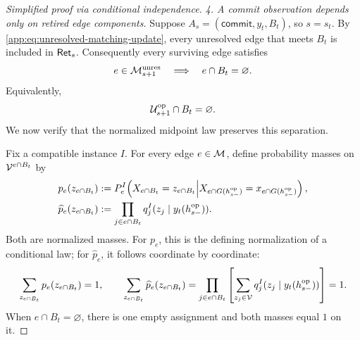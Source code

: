 {\begin{proof}[Simplified proof via conditional independence]
\emph{4. A commit observation depends only on retired edge components.}
Suppose \(A_s=(\mathsf{commit},y_t,B_t)\), so \(s=s_t\).  By
\cref{app:eq:unresolved-matching-update}, every unresolved edge that meets
\(B_t\) is included in \(\OpRetiredRecord{s}\).  Consequently every
surviving edge satisfies
\[
 e\in\OpUnresolvedMatching{s+1}
 \quad\Longrightarrow\quad e\cap B_t=\varnothing.
\]
Equivalently,
\[
 \OpUnresolvedVertices{s+1}\cap B_t=\varnothing.
\]
We now verify that the normalized midpoint law preserves this separation.

Fix a compatible instance \(I\).  For every edge
\(e\in\HiddenMatching\), define probability masses on
\(\Vocab^{e\cap B_t}\) by
\[
\begin{aligned}
 p_e(z_{e\cap B_t})
 &:=\HardEdgeLaw{e}{I}\!\left(
   X_{e\cap B_t}=z_{e\cap B_t}
   \middle|
   X_{e\cap G(\OpVisibleHistory{s})}
     =x_{e\cap G(\OpVisibleHistory{s})}\right),\\
 \widehat p_e(z_{e\cap B_t})
 &:=\prod_{j\in e\cap B_t}
       \HardOracleRowMass{I}
        {y_t(\OpVisibleHistory{s})}{j}{z_j}.
\end{aligned}
\]
Both are normalized masses.  For \(p_e\), this is the defining
normalization of a conditional law; for \(\widehat p_e\), it follows
coordinate by coordinate:
\[
 \sum_{z_{e\cap B_t}}p_e(z_{e\cap B_t})=1,
 \qquad
 \sum_{z_{e\cap B_t}}\widehat p_e(z_{e\cap B_t})
 =\prod_{j\in e\cap B_t}
   \left[\sum_{z_j\in\Vocab}
        \HardOracleRowMass{I}
         {y_t(\OpVisibleHistory{s})}{j}{z_j}\right]=1.
\]
When \(e\cap B_t=\varnothing\), there is one empty assignment and both
masses equal \(1\) on it.


\end{proof}}

